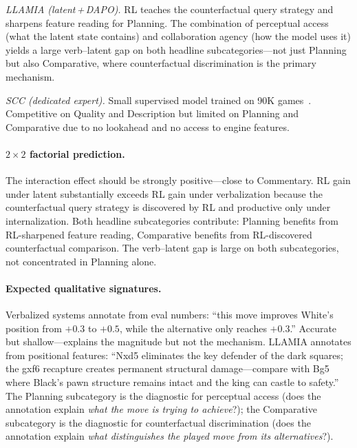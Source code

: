 \emph{LLAMIA (latent\,+\,DAPO).}
RL teaches the counterfactual query strategy and sharpens feature reading
for Planning.
The combination of perceptual access (what the latent state contains) and
collaboration agency (how the model uses it) yields a large verb--latent
gap on both headline subcategories---not just Planning but also
Comparative, where counterfactual discrimination is the primary mechanism.

\emph{SCC (dedicated expert).}
Small supervised model trained on 90K games~\cite{zang2019automated}.
Competitive on Quality and Description but limited on Planning and
Comparative due to no lookahead and no access to engine features.

\paragraph{$2{\times}2$ factorial prediction.}
The interaction effect should be strongly positive---close to Commentary.
RL gain under latent substantially exceeds RL gain under verbalization
because the counterfactual query strategy is discovered by RL and
productive only under internalization.
Both headline subcategories contribute: Planning benefits from RL-sharpened
feature reading, Comparative benefits from RL-discovered counterfactual
comparison.
The verb--latent gap is large on both subcategories, not concentrated in
Planning alone.

\paragraph{Expected qualitative signatures.}
Verbalized systems annotate from eval numbers: ``this move improves White's
position from $+0.3$ to $+0.5$, while the alternative only reaches $+0.3$.''
Accurate but shallow---explains the magnitude but not the mechanism.
LLAMIA annotates from positional features: ``Nxd5 eliminates the key
defender of the dark squares; the gxf6 recapture creates permanent
structural damage---compare with Bg5 where Black's pawn structure remains
intact and the king can castle to safety.''
The Planning subcategory is the diagnostic for perceptual access (does the
annotation explain \emph{what the move is trying to achieve}?); the
Comparative subcategory is the diagnostic for counterfactual discrimination
(does the annotation explain \emph{what distinguishes the played move from
its alternatives}?).

